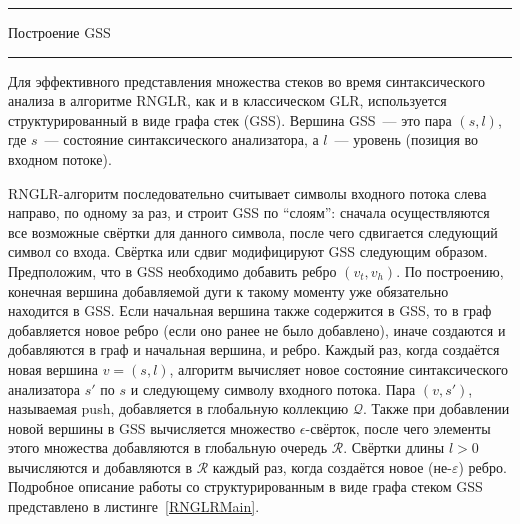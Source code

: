 \begin{listing}[!ht]
\hrule

\begin{algorithmic}[1]
\caption{Построение GSS}
\label{RNGLRMain}
  \EndIf
\EndFunction
{}
    \EndIf
  \EndIf
\EndFunction
\end{algorithmic}

\hrule
\end{listing}

Для эффективного представления множества стеков во время синтаксического анализа в алгоритме RNGLR, как и в классическом GLR, используется структурированный в виде графа стек (GSS). Вершина GSS~--- это пара $(s,l)$, где $s$~--- состояние синтаксического анализатора, а $l$~--- уровень (позиция во входном потоке).

RNGLR-алгоритм последовательно считывает символы входного потока слева направо, по одному за раз, и строит GSS по ``слоям'': сначала осуществляются все возможные свёртки для данного символа, после чего сдвигается следующий символ со входа. Свёртка или сдвиг модифицируют GSS следующим образом. Предположим, что в GSS необходимо добавить ребро $(v_t,v_h)$. По построению, конечная вершина добавляемой дуги к такому моменту уже обязательно находится в GSS. Если начальная вершина также содержится в GSS, то в граф добавляется новое ребро (если оно ранее не было добавлено), иначе создаются и добавляются в граф и начальная вершина, и ребро. Каждый раз, когда создаётся новая вершина $v=(s,l)$, алгоритм вычисляет новое состояние синтаксического анализатора $s'$ по $s$ и следующему символу входного потока. Пара $(v,s')$, называемая push, добавляется в глобальную коллекцию $\mathcal{Q}$. Также при добавлении новой вершины в GSS вычисляется множество $\epsilon$-свёрток, после чего элементы этого множества добавляются в глобальную очередь $\mathcal{R}$. Свёртки длины $l>0$ вычисляются и добавляются в $\mathcal{R}$ каждый раз, когда создаётся новое (не-$\varepsilon$) ребро. Подробное описание работы со структурированным в виде графа стеком GSS представлено в листинге~\ref{RNGLRMain}.

